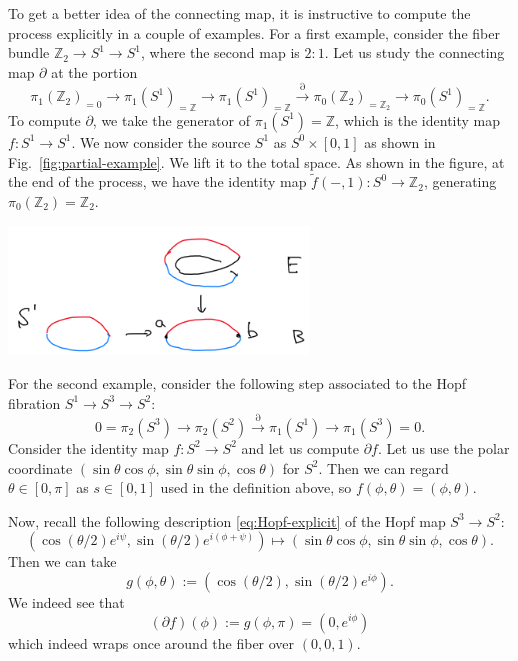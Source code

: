 \documentclass[12pt]{article}
\numberwithin{equation}{section}
\numberwithin{figure}{section}
\theoremstyle{remark}
\renewenvironment{figure}[1][]{
  \begin{originalfigure}[#1]
    \begin{mdframed}[linecolor=black!0,backgroundcolor=black!1]
}{
    \end{mdframed}
  \end{originalfigure}
}
\def\bZ{\mathbb{Z}}
\begin{document}
To get a better idea of the connecting map, it is instructive 
to compute the process explicitly in a couple of examples.
For a first example, consider the fiber bundle $\bZ_2 \to S^1 \to S^1$,
where the second map is $2:1$. 
Let us study the connecting map $\partial$ at the portion \begin{equation}
  \pi_1(\bZ_2)_{=0}\to \pi_1(S^1)_{=\bZ} \to \pi_1(S^1)_{=\bZ} \stackrel{\partial}{\longrightarrow} \pi_0(\bZ_2)_{=\bZ_2} \to \pi_0(S^1)_{=\bZ}.
\end{equation}
To compute $\partial$, we take the generator of $\pi_{1}(S^1)=\bZ$,
which is the identity map $f:S^1\to S^1$.
We now consider the source $S^1$ as $S^0 \times [0,1]$ as shown in Fig.~\ref{fig:partial-example}.
We lift it to the total space.
As shown in the figure,
at the end of the process, we have the identity map $\tilde f(-,1): S^0\to \bZ_2$, generating $\pi_0(\bZ_2)=\bZ_2$.
\begin{figure}
  \centering
  \includegraphics[width=0.6\textwidth]{partial-example}
  \caption{An illustration of the connecting map $\partial$ for the fiber bundle $\bZ_2\to S^1\to S^1$.}
  \label{fig:partial-example}
\end{figure}

For the second example, consider the following step
associated to the Hopf fibration $S^1\to S^3\to S^2$: \begin{equation}
0= \pi_2(S^3) \to \pi_2(S^2) \stackrel{\partial}{\longrightarrow} \pi_1(S^1) \to \pi_1(S^3)=0.
\end{equation}
Consider the identity map $f:S^2\to S^2$ and let us compute $\partial f$.
Let us use the polar coordinate $(\sin\theta\cos\phi,\sin\theta\sin\phi,\cos\theta)$ for $S^2$.
Then we can regard $\theta\in [0,\pi]$ as $s\in[0,1]$ used in the definition above, so $f(\phi,\theta)=(\phi,\theta)$.

Now, recall the following description \eqref{eq:Hopf-explicit} of the Hopf map $S^3\to S^2$:\begin{equation}
  (\cos(\theta/2)  e^{i \psi},
  \sin(\theta/2) e^{i(\phi+\psi)} )
  \mapsto  (\sin\theta\cos\phi,\sin\theta\sin\phi,\cos\theta).
\end{equation}
Then we can take \begin{equation}
g(\phi,\theta) := (\cos(\theta/2),\sin(\theta/2)e^{i\phi}).
\end{equation}
We indeed see that \begin{equation}
(\partial f)(\phi):= g(\phi,\pi) = (0,e^{i\phi})
\end{equation} which indeed wraps once around the fiber over $(0,0,1)$.
\end{document}
